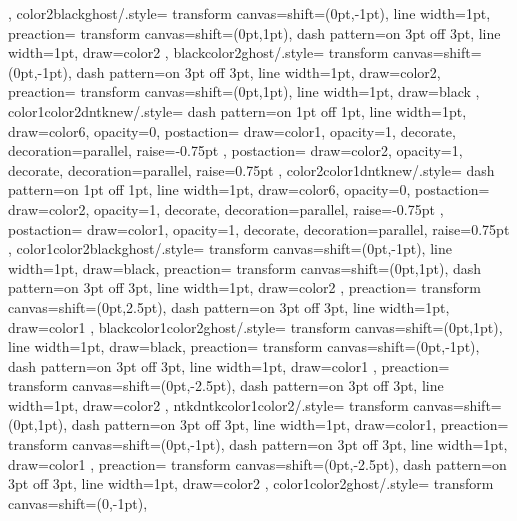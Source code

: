 {{    },
    color2blackghost/.style={
    transform canvas={shift={(0pt,-1pt)}},
    line width=1pt,
    preaction={
      transform canvas={shift={(0pt,1pt)}},
      dash pattern=on 3pt off 3pt,
      line width=1pt,
      draw=color2
    }
    },
    blackcolor2ghost/.style={
    transform canvas={shift={(0pt,-1pt)}},
    dash pattern=on 3pt off 3pt,
    line width=1pt,
    draw=color2,
    preaction={
      transform canvas={shift={(0pt,1pt)}},
      line width=1pt,
      draw=black
    }
    },
    color1color2dntknew/.style={
    dash pattern=on 1pt off 1pt,
    line width=1pt,
    draw=color6,
    opacity=0,
    postaction={
        draw=color1,
        opacity=1,
        decorate,
        decoration={parallel, raise=-0.75pt}
        },
    postaction={
        draw=color2,
        opacity=1,
        decorate,
        decoration={parallel, raise=0.75pt}
        }
    },
    color2color1dntknew/.style={
    dash pattern=on 1pt off 1pt,
    line width=1pt,
    draw=color6,
    opacity=0,
    postaction={
        draw=color2,
        opacity=1,
        decorate,
        decoration={parallel, raise=-0.75pt}
        },
    postaction={
        draw=color1,
        opacity=1,
        decorate,
        decoration={parallel, raise=0.75pt}
        }
    },
    color1color2blackghost/.style={
    transform canvas={shift={(0pt,-1pt)}},
    line width=1pt,
    draw=black,  
    preaction={
      transform canvas={shift={(0pt,1pt)}},
      dash pattern=on 3pt off 3pt,
      line width=1pt,
      draw=color2
      },
    preaction={
      transform canvas={shift={(0pt,2.5pt)}},
      dash pattern=on 3pt off 3pt,
      line width=1pt,
      draw=color1
      }  
    },
    blackcolor1color2ghost/.style={
    transform canvas={shift={(0pt,1pt)}},
    line width=1pt,
    draw=black,  
    preaction={
      transform canvas={shift={(0pt,-1pt)}},
      dash pattern=on 3pt off 3pt,
      line width=1pt,
      draw=color1
      },
    preaction={
      transform canvas={shift={(0pt,-2.5pt)}},
      dash pattern=on 3pt off 3pt,
      line width=1pt,
      draw=color2
      }  
    },
    ntkdntkcolor1color2/.style={
    transform canvas={shift={(0pt,1pt)}},
    dash pattern=on 3pt off 3pt,
    line width=1pt,
    draw=color1,
    preaction={
      transform canvas={shift={(0pt,-1pt)}},
      dash pattern=on 3pt off 3pt,
      line width=1pt,
      draw=color1
      },
    preaction={
      transform canvas={shift={(0pt,-2.5pt)}},
      dash pattern=on 3pt off 3pt,
      line width=1pt,
      draw=color2
      }  
    },
    color1color2ghost/.style={
    transform canvas={shift={(0,-1pt)}},
}}
